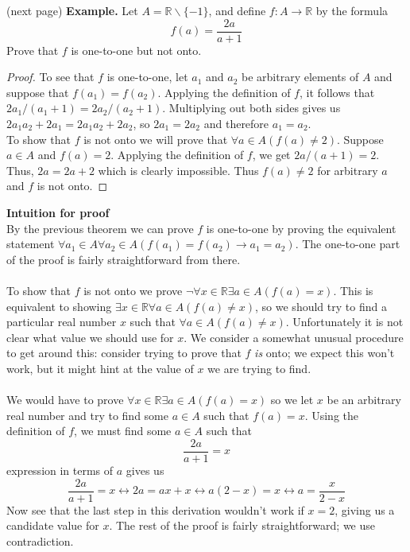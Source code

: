 \documentclass{report}
\theoremstyle{definition}
\begin{document}
\noindent(next page)\newpage
\noindent\textbf{Example.} Let $A=\mathbb R\backslash\{-1\}$, and define $f:A\to\mathbb R$ by the formula 
\begin{equation*}
f(a)=\frac{2a}{a+1}
\end{equation*}
Prove that $f$ is one-to-one but not onto.
\begin{proof}
To see that $f$ is one-to-one, let $a_1$ and $a_2$ be arbitrary elements of $A$ and suppose that $f(a_1)=f(a_2)$. Applying the definition of $f$, it follows that $2a_1/(a_1+1)=2a_2/(a_2+1)$. 
Multiplying out both sides gives us $2a_1a_2+2a_1=2a_1a_2+2a_2$, so $2a_1=2a_2$ and therefore $a_1=a_2$.\\
\indent To show that $f$ is not onto we will prove that $\forall a\in A(f(a)\neq2)$. Suppose $a\in A$ and $f(a)=2$. Applying the definition of $f$, we get $2a/(a+1)=2$. Thus, $2a=2a+2$ which is
clearly impossible. Thus $f(a)\neq2$ for arbitrary $a$ and $f$ is not onto.
\end{proof}
\noindent\textbf{Intuition for proof}\\
By the previous theorem we can prove $f$ is one-to-one by proving the equivalent statement $\forall a_1\in A\forall a_2\in A(f(a_1)=f(a_2)\to a_1=a_2)$. The one-to-one part of the proof is
fairly straightforward from there.\\
\vspace{1mm}\\
To show that $f$ is not onto we prove $\neg\forall x\in\mathbb R\exists a\in A(f(a)=x)$. This is equivalent to showing $\exists x\in\mathbb R\forall a\in A(f(a)\neq x)$, so we should try to find
a particular real number $x$ such that $\forall a\in A(f(a)\neq x)$. Unfortunately it is not clear what value we should use for $x$. We consider a somewhat unusual procedure to get around this:
consider trying to prove that $f$ \textit{is} onto; we expect this won't work, but it might hint at the value of $x$ we are trying to find.\\
\vspace{1mm}\\
We would have to prove $\forall x\in\mathbb R\exists a\in A(f(a)=x)$ so we let $x$ be an arbitrary
real number and try to find some $a\in A$ such that $f(a)=x$. Using the definition of $f$, we 
must find some $a\in A$ such that 
\begin{equation*}
\frac{2a}{a+1}=x
\end{equation*}
expression in terms of $a$ gives us
\begin{equation*}
\frac{2a}{a+1}=x\leftrightarrow2a=ax+x\leftrightarrow a(2-x)=x\leftrightarrow a=\frac{x}{2-x}
\end{equation*}
Now see that the last step in this derivation wouldn't work if $x=2$, giving us a candidate value for $x$. The rest of the proof is fairly straightforward; we use contradiction.
\newpage
\end{document}
